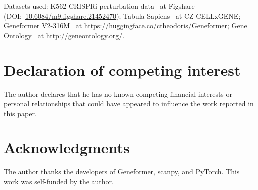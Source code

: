 \documentclass[11pt,onecolumn]{article}
\begin{document}
Datasets used: K562 CRISPRi perturbation data~\citep{replogle2022mapping} at Figshare (DOI:~\url{10.6084/m9.figshare.21452470}); Tabula Sapiens~\citep{tabula2022tabula} at CZ CELLxGENE; Geneformer V2-316M~\citep{theodoris2023transfer} at \url{https://huggingface.co/ctheodoris/Geneformer}; Gene Ontology~\citep{ashburner2000go} at \url{http://geneontology.org/}.






\section*{Declaration of competing interest}
The author declares that he has no known competing financial interests or personal relationships that could have appeared to influence the work reported in this paper.

\section*{Acknowledgments}
The author thanks the developers of Geneformer, scanpy, and PyTorch. This work was self-funded by the author.



\end{document}
